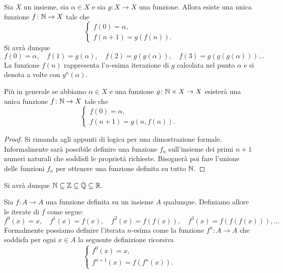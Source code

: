 \begin{theorem}
\label{th:induzione}%
Sia $X$ un insieme, sia $\alpha\in X$ e sia $g\colon X\to X$ una funzione.
Allora esiste una unica funzione $f\colon \mathbb N \to X$ tale che
\begin{equation}\label{eq:4835628}
  \begin{cases}
    f(0) = \alpha, \\
    f(n+1) = g(f(n)).
  \end{cases}
\end{equation}
Si avrà dunque
\[
  f(0) = \alpha,\quad
  f(1) = g(\alpha),\quad
  f(2) = g(g(\alpha)),\quad
  f(3) = g(g(g(\alpha)))\dots
\]
La funzione $f(n)$ rappresenta l'$n$-esima iterazione di $g$
calcolata nel punto $\alpha$ e si denota a volte con $g^n(\alpha)$.

Più in generale se abbiamo $\alpha\in X$ e una funzione $g\colon \mathbb N \times X \to X$
esisterà una unica funzione $f\colon \mathbb N \to X$ tale che
%
\begin{equation}
  \begin{cases}
    f(0) = \alpha, \\
    f(n+1) = g(n, f(n)).
  \end{cases}
\end{equation}
\end{theorem}
%
\begin{proof}
Si rimanda agli appunti di logica \cite{appunti_logica}
per una dimostrazione formale.
Informalmente sarà possibile definire una
funzione $f_n$ sull'insieme dei primi $n+1$ numeri naturali
che soddisfi le proprietà richieste. Bisognerà poi
fare l'unione delle funzioni $f_n$ per ottenere una funzione
definita su tutto $\mathbb N$.
\end{proof}

Si avrà dunque $\mathbb N \subseteq \mathbb Z \subseteq \mathbb Q \subseteq \mathbb R$.

\begin{definition}[iterata]
  Sia $f\colon A \to A$ una funzione definita su un insieme $A$ qualunque.
  Definiamo allore le iterate di $f$ come segue:
  \[
    f^0(x) = x, \quad f^1(x) = f(x), \quad
    f^2(x) = f(f(x)), \quad f^3(x) = f(f(f(x))), \dots
  \]
  Formalmente possiamo definire l'iterata $n$-esima
  come la funzione $f^n\colon A \to A$ che soddisfa
  per ogni $x\in A$ la
  seguente definizione ricorsiva
  \[
   \begin{cases}
       f^0(x) = x,\\
       f^{n+1}(x) = f(f^n(x)).
   \end{cases}
  \]
\end{definition}


